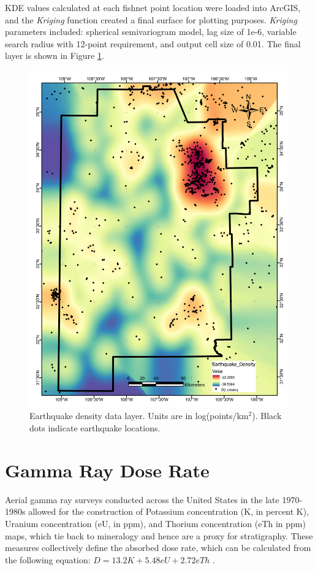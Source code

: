 KDE values calculated at each fishnet point location were loaded into ArcGIS, and the \textit{Kriging} function created a final surface for plotting purposes. \textit{Kriging} parameters included: spherical semivariogram model, lag size of 1e-6, variable search radius with 12-point requirement, and output cell size of 0.01. The final layer is shown in Figure \ref{fig:feat_EQ_density}.
\vfill
\pagebreak

\begin{figure}[H]
\centering
\includegraphics[width=0.75\linewidth]{templates/images/Figure-EarthquakeDensity.pdf}
\caption[Earthquake density data layer]{Earthquake density data layer. Units are in log(points/km$^2$). Black dots indicate earthquake locations.}
\label{fig:feat_EQ_density}
\end{figure}
\pagebreak

\section{Gamma Ray Dose Rate}\label{app:dl_gamma_dose}
Aerial gamma ray surveys conducted across the United States in the late 1970-1980s allowed for the construction of Potassium concentration (K, in percent K), Uranium concentration (eU, in ppm), and Thorium concentration (eTh in ppm) maps, which tie back to mineralogy and hence are a proxy for stratigraphy. These measures collectively define the absorbed dose rate, which can be calculated from the following equation: $D = 13.2 K + 5.48 eU + 2.72 eTh$ \citep{duval_terrestrial_2005}.

